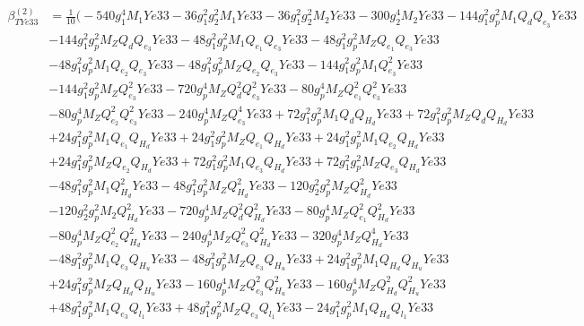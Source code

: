 \begin{align}
\beta_{TYe33}^{(2)} & =  
\frac{1}{10} \Big(-540 g_{1}^{4} M_1 Ye33 -36 g_{1}^{2} g_{2}^{2} M_1 Ye33 -36 g_{1}^{2} g_{2}^{2} M_2 Ye33 -300 g_{2}^{4} M_2 Ye33 -144 g_{1}^{2} g_{p}^{2} M_1 Q_{d} Q_{e_3} Ye33 \nonumber \\ 
 &-144 g_{1}^{2} g_{p}^{2} M_Z Q_{d} Q_{e_3} Ye33 -48 g_{1}^{2} g_{p}^{2} M_1 Q_{e_{1}} Q_{e_3} Ye33 -48 g_{1}^{2} g_{p}^{2} M_Z Q_{e_{1}} Q_{e_3} Ye33 \nonumber \\ 
 &-48 g_{1}^{2} g_{p}^{2} M_1 Q_{e_{2}} Q_{e_3} Ye33 -48 g_{1}^{2} g_{p}^{2} M_Z Q_{e_{2}} Q_{e_3} Ye33 -144 g_{1}^{2} g_{p}^{2} M_1 Q_{e_3}^{2} Ye33 \nonumber \\ 
 &-144 g_{1}^{2} g_{p}^{2} M_Z Q_{e_3}^{2} Ye33 -720 g_{p}^{4} M_Z Q_{d}^{2} Q_{e_3}^{2} Ye33 -80 g_{p}^{4} M_Z Q_{e_{1}}^{2} Q_{e_3}^{2} Ye33 \nonumber \\ 
 &-80 g_{p}^{4} M_Z Q_{e_{2}}^{2} Q_{e_3}^{2} Ye33 -240 g_{p}^{4} M_Z Q_{e_3}^{4} Ye33 +72 g_{1}^{2} g_{p}^{2} M_1 Q_{d} Q_{H_d} Ye33 +72 g_{1}^{2} g_{p}^{2} M_Z Q_{d} Q_{H_d} Ye33 \nonumber \\ 
 &+24 g_{1}^{2} g_{p}^{2} M_1 Q_{e_{1}} Q_{H_d} Ye33 +24 g_{1}^{2} g_{p}^{2} M_Z Q_{e_{1}} Q_{H_d} Ye33 +24 g_{1}^{2} g_{p}^{2} M_1 Q_{e_{2}} Q_{H_d} Ye33 \nonumber \\ 
 &+24 g_{1}^{2} g_{p}^{2} M_Z Q_{e_{2}} Q_{H_d} Ye33 +72 g_{1}^{2} g_{p}^{2} M_1 Q_{e_3} Q_{H_d} Ye33 +72 g_{1}^{2} g_{p}^{2} M_Z Q_{e_3} Q_{H_d} Ye33 \nonumber \\ 
 &-48 g_{1}^{2} g_{p}^{2} M_1 Q_{H_d}^{2} Ye33 -48 g_{1}^{2} g_{p}^{2} M_Z Q_{H_d}^{2} Ye33 -120 g_{2}^{2} g_{p}^{2} M_Z Q_{H_d}^{2} Ye33 \nonumber \\ 
 &-120 g_{2}^{2} g_{p}^{2} M_2 Q_{H_d}^{2} Ye33 -720 g_{p}^{4} M_Z Q_{d}^{2} Q_{H_d}^{2} Ye33 -80 g_{p}^{4} M_Z Q_{e_{1}}^{2} Q_{H_d}^{2} Ye33 \nonumber \\ 
 &-80 g_{p}^{4} M_Z Q_{e_{2}}^{2} Q_{H_d}^{2} Ye33 -240 g_{p}^{4} M_Z Q_{e_3}^{2} Q_{H_d}^{2} Ye33 -320 g_{p}^{4} M_Z Q_{H_d}^{4} Ye33 \nonumber \\ 
 &-48 g_{1}^{2} g_{p}^{2} M_1 Q_{e_3} Q_{H_u} Ye33 -48 g_{1}^{2} g_{p}^{2} M_Z Q_{e_3} Q_{H_u} Ye33 +24 g_{1}^{2} g_{p}^{2} M_1 Q_{H_d} Q_{H_u} Ye33 \nonumber \\ 
 &+24 g_{1}^{2} g_{p}^{2} M_Z Q_{H_d} Q_{H_u} Ye33 -160 g_{p}^{4} M_Z Q_{e_3}^{2} Q_{H_u}^{2} Ye33 -160 g_{p}^{4} M_Z Q_{H_d}^{2} Q_{H_u}^{2} Ye33 \nonumber \\ 
 &+48 g_{1}^{2} g_{p}^{2} M_1 Q_{e_3} Q_{l_1} Ye33 +48 g_{1}^{2} g_{p}^{2} M_Z Q_{e_3} Q_{l_1} Ye33 -24 g_{1}^{2} g_{p}^{2} M_1 Q_{H_d} Q_{l_1} Ye33 \nonumber \\ 

\end{align}
